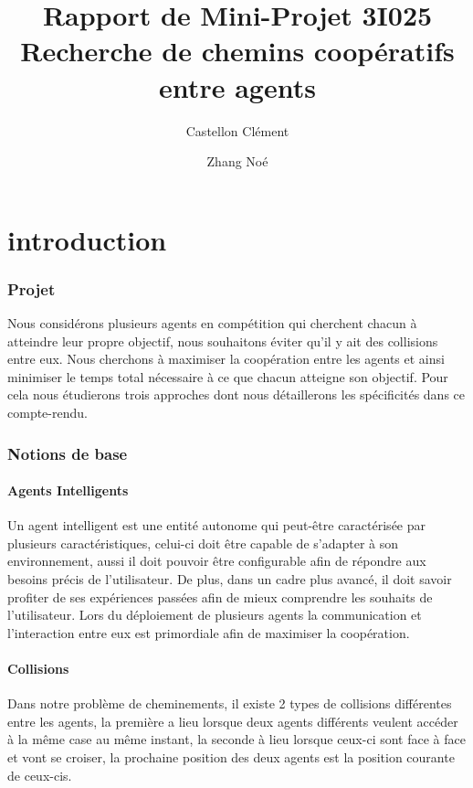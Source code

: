 \documentclass{article}
\begin{document}
	
	\title{Rapport de Mini-Projet 3I025 \\
		\large Recherche de chemins coopératifs entre agents}
	\author{Castellon Clément \and Zhang Noé}
	\maketitle
	
	\part{introduction}
	
		\section{Projet}
		
			Nous considérons plusieurs agents en compétition qui cherchent chacun à atteindre leur propre objectif, nous souhaitons éviter qu'il y ait des collisions entre eux.
			Nous cherchons à maximiser la coopération entre les agents et ainsi minimiser le temps total nécessaire à ce que chacun atteigne son objectif.
			Pour cela nous étudierons trois approches dont nous détaillerons les spécificités dans ce compte-rendu.
			
			
		\section{Notions de base}
	
			\subsection{Agents Intelligents}
				Un agent intelligent est une entité autonome qui peut-être caractérisée par plusieurs caractéristiques, celui-ci doit être capable de s'adapter à son environnement, aussi il doit pouvoir être configurable afin de répondre aux besoins précis de l'utilisateur. De plus, dans un cadre plus avancé, il doit savoir profiter de ses expériences passées afin de mieux comprendre les souhaits de l'utilisateur. Lors du déploiement de plusieurs agents la communication et l'interaction entre eux est primordiale afin de maximiser la coopération.
			
			\subsection{Collisions}
				Dans notre problème de cheminements, il existe 2 types de collisions différentes entre  les agents, la première a lieu lorsque deux agents différents veulent accéder à la même case au même instant, la seconde à lieu lorsque ceux-ci sont face à face et vont se croiser, la prochaine position des deux agents est la position courante de ceux-cis.
			
\end{document}
